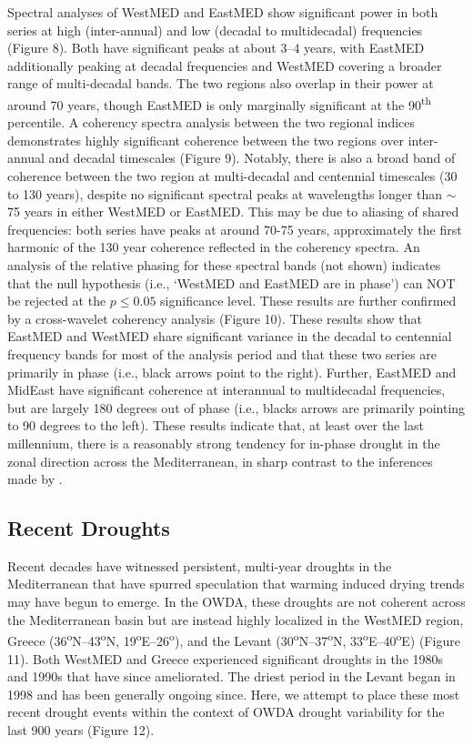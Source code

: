 \documentclass[draft,jgr]{AGUTeX}
\begin{document}
\begin{article}
\indent Spectral analyses of WestMED and EastMED show significant power in both series at high (inter-annual) and low (decadal to multidecadal) frequencies (Figure 8). Both have significant peaks at about 3--4 years, with EastMED additionally peaking at decadal frequencies and WestMED covering a broader range of multi-decadal bands. The two regions also overlap in their power at around 70 years, though EastMED is only marginally significant at the 90\textsuperscript{th} percentile. A coherency spectra analysis between the two regional indices demonstrates highly significant coherence between the two regions over inter-annual and decadal timescales (Figure 9). Notably, there is also a broad band of coherence between the two region at multi-decadal and centennial timescales (30 to 130 years), despite no significant spectral peaks at wavelengths longer than $\sim$75 years in either WestMED or EastMED. This may be due to aliasing of shared frequencies: both series have peaks at around 70-75 years, approximately the first harmonic of the 130 year coherence reflected in the coherency spectra. An analysis of the relative phasing for these spectral bands (not shown) indicates that the null hypothesis (i.e., `WestMED and EastMED are in phase') can NOT be rejected at the $p\le0.05$ significance level. These results are further confirmed by a cross-wavelet coherency analysis (Figure 10). These results show that EastMED and WestMED share significant variance in the decadal to centennial frequency bands for most of the analysis period and that these two series are primarily in phase (i.e., black arrows point to the right). Further, EastMED and MidEast have significant coherence at interannual to multidecadal frequencies, but are largely 180 degrees out of phase (i.e., blacks arrows are primarily pointing to 90 degrees to the left). These results indicate that, at least over the last millennium, there is a reasonably strong tendency for in-phase drought in the zonal direction across the Mediterranean, in sharp contrast to the inferences made by \citet{Roberts:etal2012}.

\subsection{Recent Droughts}
\noindent Recent decades have witnessed persistent, multi-year droughts in the Mediterranean that have spurred speculation that warming induced drying trends may have begun to emerge. In the OWDA, these droughts are not coherent across the Mediterranean basin but are instead highly localized in the WestMED region, Greece (36\textsuperscript{o}N--43\textsuperscript{o}N, 19\textsuperscript{o}E--26\textsuperscript{o}), and the Levant (30\textsuperscript{o}N--37\textsuperscript{o}N, 33\textsuperscript{o}E--40\textsuperscript{o}E) (Figure 11). Both WestMED and Greece experienced significant droughts in the 1980s and 1990s that have since ameliorated. The driest period in the Levant began in 1998 and has been generally ongoing since. Here, we attempt to place these most recent drought events within the context of OWDA drought variability for the last 900 years (Figure 12).


\end{article}
\end{document}
